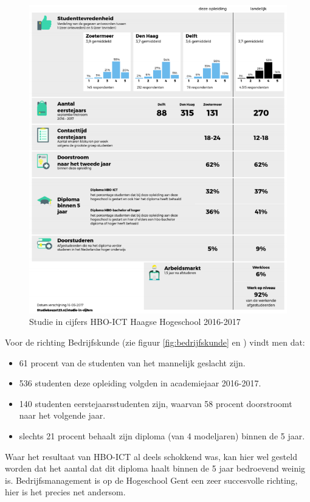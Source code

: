 \begin{figure}
	\includegraphics[width=\textwidth]
	{img/hbo-ict.png}
	\caption{Studie in cijfers HBO-ICT Haagse Hogeschool 2016-2017}
	\label{fig:hbo-ict}
\end{figure}


Voor de richting Bedrijfskunde (zie figuur \ref{fig:bedrijfskunde} en \textcite{Studiekeuze2017}) vindt men dat:
\begin{itemize}
	\item 61 procent van de studenten van het mannelijk geslacht zijn.
	\item 536 studenten deze opleiding volgden in academiejaar 2016-2017.
	\item 140 studenten eerstejaarsstudenten zijn, waarvan 58 procent doorstroomt naar het volgende jaar.
	\item slechts 21 procent behaalt zijn diploma (van 4 modeljaren) binnen de 5 jaar.
\end{itemize}

Waar het resultaat van HBO-ICT al deels schokkend was, kan hier wel gesteld worden dat het aantal dat dit diploma haalt binnen de 5 jaar bedroevend weinig is. Bedrijfsmanagement is op de Hogeschool Gent een zeer succesvolle richting, hier is het precies net andersom.

